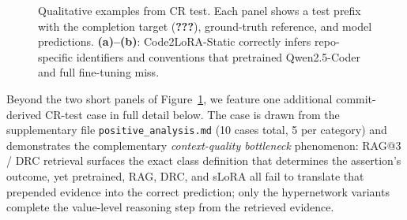 \documentclass[11pt]{article}
\newcommand{\codelora}{Code2LoRA\xspace}
\newcommand{\codelorastatic}{\codelora-Static\xspace}
\begin{document}
\begin{figure}[t]
\begin{center}
\caption{Qualitative examples from CR test. Each panel shows a test prefix with the completion target (\colorbox{yellow!30}{\textbf{???}}), ground-truth reference, and model predictions.
\textbf{(a)--(b)}: \codelorastatic{} correctly infers repo-specific identifiers and conventions that pretrained Qwen2.5-Coder and full fine-tuning miss.}
\label{fig:qualitative}
\end{center}
\end{figure}

Beyond the two short panels of Figure~\ref{fig:qualitative}, we feature one additional commit-derived CR-test case in full detail below.
The case is drawn from the supplementary file \texttt{positive\_analysis.md} (10 cases total, 5 per category) and demonstrates the complementary \emph{context-quality bottleneck} phenomenon: RAG@3 / DRC retrieval surfaces the exact class definition that determines the assertion's outcome, yet pretrained, RAG, DRC, and sLoRA all fail to translate that prepended evidence into the correct prediction; only the hypernetwork variants complete the value-level reasoning step from the retrieved evidence.
\end{document}
